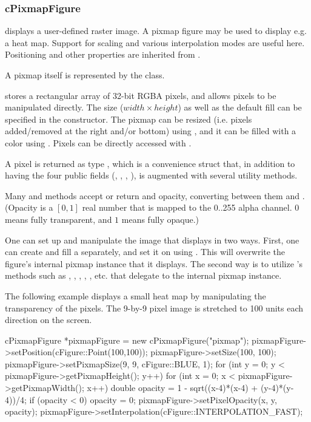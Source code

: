 \subsubsection{cPixmapFigure}

 displays a user-defined raster image. A pixmap
figure may be used to display e.g. a heat map. Support for scaling and
various interpolation modes are useful here. Positioning and other
properties are inherited from .

A pixmap itself is represented by the  class.

 stores a rectangular array of 32-bit RGBA pixels,
and allows pixels to be manipulated directly. The size ($width \times
height$) as well as the default fill can be specified in the constructor.
The pixmap can be resized (i.e. pixels added/removed at the right and/or bottom)
using , and it can be filled with a color using .
Pixels can be directly accessed with .

A pixel is returned as type , which is a convenience
struct that, in addition to having the four public  fields
(, , , ), is augmented with several
utility methods.

Many  and  methods accept or return
 and opacity, converting between them and
. (Opacity is a $[0,1]$ real number that is mapped to the
0..255 alpha channel. $0$ means fully transparent, and $1$ means fully
opaque.)

One can set up and manipulate the image that  displays
in two ways. First, one can create and fill a 
separately, and set it on  using .
This will overwrite the figure's internal pixmap instance that it displays.
The second way is to utilize 's methods such as
, , ,
, , etc. that delegate to
the internal pixmap instance.

The following example displays a small heat map by manipulating the
transparency of the pixels. The 9-by-9 pixel image is stretched to
100 units each direction on the screen.

\begin{cpp}
cPixmapFigure *pixmapFigure = new cPixmapFigure("pixmap");
pixmapFigure->setPosition(cFigure::Point(100,100));
pixmapFigure->setSize(100, 100);
pixmapFigure->setPixmapSize(9, 9, cFigure::BLUE, 1);
for (int y = 0; y < pixmapFigure->getPixmapHeight(); y++) {
    for (int x = 0; x < pixmapFigure->getPixmapWidth(); x++) {
        double opacity = 1 - sqrt((x-4)*(x-4) + (y-4)*(y-4))/4;
        if (opacity < 0) opacity = 0;
        pixmapFigure->setPixelOpacity(x, y, opacity);
    }
}
pixmapFigure->setInterpolation(cFigure::INTERPOLATION_FAST);
\end{cpp}

